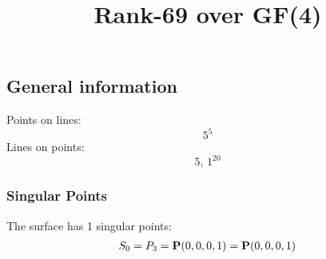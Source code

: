 \documentclass{article}
\newcommand\setTBstruts{\def\T{\rule{0pt}{2.6ex}}%
\def\B{\rule[-1.2ex]{0pt}{0pt}}}
\newcommand{\bP}{{\bf P}}
\begin{document}
 
\setTBstruts



{\allowdisplaybreaks%






\title{Rank-69 over GF(4)}
\author{}%
\maketitle%
%
{}



\subsection*{General information}
Points on lines:
$$
5^5$$
Lines on points:
$$
5,\,1^{20}$$
\subsubsection*{Singular Points}
The surface has 1 singular points:\\
\begin{align*}
S_{0} &= P_{3}=\bP(0, 0, 0, 1) = \bP(0, 0, 0, 1)\\
\end{align*}
}
\end{document}
